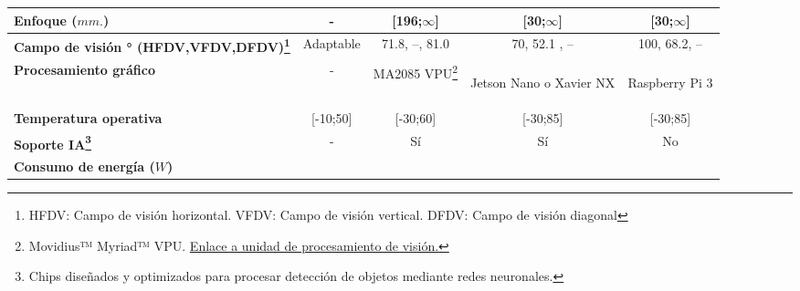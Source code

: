 \begin{itemize}
\begin{savenotes}
\begin{mytable}[H]
\begin{tabular}{l|c|c|c|c|}
{\begin{minipage}{\myforthmaxsizeofcontenttable}
					\textbf{Enfoque ($mm.$)}
				\end{minipage}
			} & - & [196;$\infty$] & [30;$\infty$] & [30;$\infty$] \\ \hline
			\multicolumn{1}{|l|}{
				\begin{minipage}{\myforthmaxsizeofcontenttable}
					\textbf{Campo de visión ° (HFDV,VFDV,DFDV)\footnote{HFDV: Campo de visión horizontal. VFDV: Campo de visión vertical. DFDV: Campo de visión diagonal}}
				\end{minipage}
			} & Adaptable & 71.8, --, 81.0 & 70, 52.1 , -- & 100, 68.2, -- \\ \hline
			\multicolumn{1}{|l|}{
				\begin{minipage}{\myforthmaxsizeofcontenttable}	
					\textbf{Procesamiento gráfico}
				\end{minipage}
			} & - & MA2085 VPU\footnote{Movidius™ Myriad™ VPU. \href{https://www.intel.com/content/www/us/en/products/processors/movidius-vpu/movidius-myriad-x.html}{Enlace a unidad de procesamiento de visión.}} & 
			\begin{minipage}{\mythirdmaxsizeofcontenttable}\begin{myflushcenterinsidetable}
				Jetson Nano o Xavier NX
			\end{myflushcenterinsidetable}\end{minipage}
		 	& \begin{minipage}{\mythirdmaxsizeofcontenttable}\begin{myflushcenterinsidetable}
		 			Raspberry Pi 3
		 	\end{myflushcenterinsidetable}\end{minipage} \\ \hline 
		 	\multicolumn{1}{|l|}{
		 		\begin{minipage}{\myforthmaxsizeofcontenttable}	
		 			\textbf{Temperatura operativa}
		 		\end{minipage}
		 	} & [-10;50] & [-30;60] & [-30;85] & [-30;85] \\ \hline
			\multicolumn{1}{|l|}{
				\begin{minipage}{\myforthmaxsizeofcontenttable}	
					\textbf{Soporte IA\footnote{Chips diseñados y optimizados para procesar detección de objetos mediante redes neuronales.}}
				\end{minipage}
			} & - & Sí & Sí & No \\ \hline
			\multicolumn{1}{|l|}{
				\begin{minipage}{\myforthmaxsizeofcontenttable}	
					\textbf{Consumo de energía ($W$)}

\end{minipage}}
\end{tabular}
\end{mytable}
\end{savenotes}
\end{itemize}

